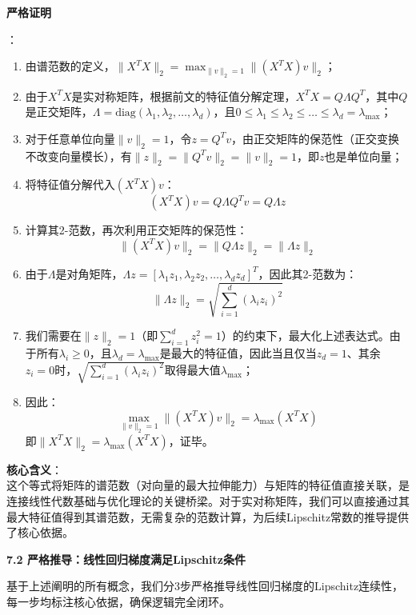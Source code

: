 \documentclass[10pt]{article}
\numberwithin{equation}{section}
\theoremstyle{plain}
\theoremstyle{definition}
\theoremstyle{remark}
\begin{document}
{\par\vspace{0.8ex}\noindent\normalsize\bfseries\color{secblue} 严格证明\par}：
\begin{enumerate}[label=\arabic*., leftmargin=*]
    \item 由谱范数的定义，$\|X^T X\|_2 = \max_{\|v\|_2=1} \|(X^T X) v\|_2$；
    \item 由于$X^T X$是实对称矩阵，根据前文的特征值分解定理，$X^T X = Q \Lambda Q^T$，其中$Q$是正交矩阵，$\Lambda = \text{diag}(\lambda_1, \lambda_2, \dots, \lambda_d)$，且$0 \le \lambda_1 \le \lambda_2 \le \dots \le \lambda_d = \lambda_{\text{max}}$；
    \item 对于任意单位向量$\|v\|_2=1$，令$z = Q^T v$，由正交矩阵的保范性（正交变换不改变向量模长），有$\|z\|_2 = \|Q^T v\|_2 = \|v\|_2 = 1$，即$z$也是单位向量；
    \item 将特征值分解代入$(X^T X)v$：
    \[ (X^T X) v = Q \Lambda Q^T v = Q \Lambda z \]
    \item 计算其2-范数，再次利用正交矩阵的保范性：
    \[ \|(X^T X) v\|_2 = \|Q \Lambda z\|_2 = \|\Lambda z\|_2 \]
    \item 由于$\Lambda$是对角矩阵，$\Lambda z = [\lambda_1 z_1, \lambda_2 z_2, \dots, \lambda_d z_d]^T$，因此其2-范数为：
    \[ \|\Lambda z\|_2 = \sqrt{\sum_{i=1}^d (\lambda_i z_i)^2} \]
    \item 我们需要在$\|z\|_2=1$（即$\sum_{i=1}^d z_i^2 = 1$）的约束下，最大化上述表达式。由于所有$\lambda_i \ge 0$，且$\lambda_d = \lambda_{\text{max}}$是最大的特征值，因此当且仅当$z_d=1$、其余$z_i=0$时，$\sqrt{\sum_{i=1}^d (\lambda_i z_i)^2}$取得最大值$\lambda_{\text{max}}$；
    \item 因此：
    \[ \max_{\|v\|_2=1} \|(X^T X) v\|_2 = \lambda_{\text{max}}(X^T X) \]
    即$\|X^T X\|_2 = \lambda_{\text{max}}(X^T X)$，证毕。
\end{enumerate}

\textbf{核心含义}：\\
这个等式将矩阵的谱范数（对向量的最大拉伸能力）与矩阵的特征值直接关联，是连接线性代数基础与优化理论的关键桥梁。对于实对称矩阵，我们可以直接通过其最大特征值得到其谱范数，无需复杂的范数计算，为后续Lipschitz常数的推导提供了核心依据。

{\par\vspace{0.8ex}\noindent\normalsize\bfseries\color{accentD} 7.2 严格推导：线性回归梯度满足Lipschitz条件\par}
基于上述阐明的所有概念，我们分3步严格推导线性回归梯度的Lipschitz连续性，每一步均标注核心依据，确保逻辑完全闭环。
\end{document}
